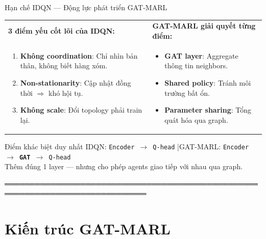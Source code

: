 \documentclass[aspectratio=169]{beamer}
\begin{document}
\begin{frame}{Hạn chế IDQN — Động lực phát triển GAT-MARL}
  
  \begin{tabular}{p{} p{}}
    \textbf{3 điểm yếu cốt lõi của IDQN:} & \textbf{GAT-MARL giải quyết từng điểm:} \\
    
    \vspace{-0.5em}
    \begin{enumerate}
      \small
      \item \textbf{Không coordination}: Chỉ nhìn bản thân, không biết hàng xóm.
      \item \textbf{Non-stationarity}: Cập nhật đồng thời $\Rightarrow$ khó hội tụ.
      \item \textbf{Không scale}: Đổi topology phải train lại.
    \end{enumerate}
    & 
    \vspace{-0.5em}
    \small
    \begin{itemize}
        \item \textbf{GAT layer}: Aggregate thông tin neighbors.
        \item \textbf{Shared policy}: Tránh môi trường bất ổn.
        \item \textbf{Parameter sharing}: Tổng quát hóa qua graph.
    \end{itemize} \\
  \end{tabular}

  \vspace{0.2em}
  \begin{alertblock}{Điểm khác biệt duy nhất}
    \small IDQN: \texttt{Encoder $\to$ Q-head} \quad|\quad GAT-MARL: \texttt{Encoder $\to$ \textbf{GAT} $\to$ Q-head}\\
    Thêm đúng 1 layer — nhưng cho phép agents giao tiếp với nhau qua graph.
  \end{alertblock}
\end{frame}

══════════════════════════════════════════════════════════════════════════════
\section{Kiến trúc GAT-MARL}
\end{document}
